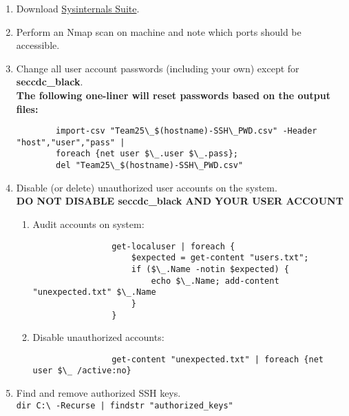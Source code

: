 \documentclass[12pt,letterpaper]{article}
\def\code#1{\textcolor{iris}{\texttt{#1}}}
\def\bf#1{\textbf{#1}}
\begin{document}
\begin{enumerate}
	\item Download \href{https://download.sysinternals.com/files/SysinternalsSuite.zip}{Sysinternals Suite}.
	\item Perform an Nmap scan on machine and note which ports should be accessible.
	\item Change all user account passwords (including your own) except for \bf{seccdc\_black}. \\
		\bf{The following one-liner will reset passwords based on the output files:}
		{ \color{iris} \begin{verbatim}
		import-csv "Team25\_$(hostname)-SSH\_PWD.csv" -Header "host","user","pass" |
		foreach {net user $\_.user $\_.pass};
		del "Team25\_$(hostname)-SSH\_PWD.csv"
		\end{verbatim} }
	\item Disable (or delete) unauthorized user accounts on the system. \\
	\bf{DO NOT DISABLE seccdc\_black AND YOUR USER ACCOUNT}
		\begin{enumerate}
			\item Audit accounts on system:
				{ \color{iris} \begin{verbatim}
				get-localuser | foreach {
					$expected = get-content "users.txt";
					if ($\_.Name -notin $expected) {
						echo $\_.Name; add-content "unexpected.txt" $\_.Name
					}
				}
				\end{verbatim} }
			\item Disable unauthorized accounts:
				{ \color{iris} \begin{verbatim}
				get-content "unexpected.txt" | foreach {net user $\_ /active:no}
				\end{verbatim} }
		\end{enumerate}
	\item Find and remove authorized SSH keys. \\
		\code{dir C:\textbackslash{} -Recurse | findstr "authorized\_keys"}


\end{enumerate}
\end{document}
